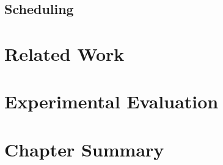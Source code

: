 \subsection{Scheduling}

\section{Related Work}


\section{Experimental Evaluation}

\section{Chapter Summary}

